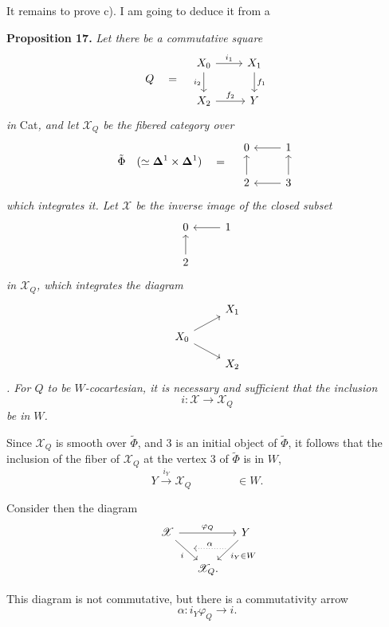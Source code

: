 \documentclass[11pt]{article}
\newcommand{\printedpage}[1]{\marginpar{\footnotesize p.~#1}}
\newcommand{\msp}[1]{\marginpar{\footnotesize [#1]}}
\newcommand{\cX}{\mathscr{X}}
\begin{document}
\printedpage{150}

It remains to prove c). I am going to deduce it from a

\textbf{Proposition 17.} \textit{Let there be a commutative square}
\[
Q \quad = \quad
\begin{tikzcd}[ampersand replacement=\&]
X_0 \arrow[r, "i_1"] \arrow[d, "i_2"'] \& X_1 \arrow[d, "f_1"] \\
X_2 \arrow[r, "f_2"] \& Y
\end{tikzcd}
\]
\textit{in} Cat\textit{, and let $\cX_Q$ be the fibered category over}
\[
\tilde{\Phi} \quad (\simeq \mathbf{\Delta}^1 \times \mathbf{\Delta}^1) \quad = \quad
\begin{tikzcd}[ampersand replacement=\&]
0 \& 1 \arrow[l] \\
2 \arrow[u] \& 3 \arrow[l] \arrow[u]
\end{tikzcd}
\]
\textit{which integrates it. Let $\cX$ be the inverse image of the closed subset}
\[
\begin{tikzcd}[ampersand replacement=\&]
0 \& 1 \arrow[l] \\
2 \arrow[u] \&
\end{tikzcd}
\]
\msp{page 235}
\textit{in $\cX_Q$, which integrates the diagram}
\[
\begin{tikzcd}[ampersand replacement=\&, row sep=small]
 \& X_1 \\
X_0 \arrow[ru] \arrow[rd] \& \\
 \& X_2
\end{tikzcd}
\]
\textit{. For $Q$ to be $W$-cocartesian, it is necessary and sufficient that the inclusion}
\[
i : \cX \longrightarrow \cX_Q
\]
\textit{be in $W$.}

Since $\cX_Q$ is smooth over $\tilde{\Phi}$, and 3 is an initial object of $\tilde{\Phi}$, it follows that the inclusion of the fiber of $\cX_Q$ at the vertex 3 of $\tilde{\Phi}$ is in $W$,
\[
Y \xrightarrow{i_Y} \cX_Q \qquad\qquad \in W.
\]

Consider then the diagram
\[
\begin{tikzcd}[ampersand replacement=\&, column sep=small]
\cX \arrow[rr, "\varphi_Q"] \arrow[rd, "i"', ""{name=direct,pos=.55,above right}] \& \& Y \arrow[ld, "i_Y\in W", ""{name=via,pos=.30,below left}] \\
 \& \cX_Q. \& \arrow[from=via,to=direct,dotted,shorten <=1pt,shorten >=1pt,"\alpha"']
\end{tikzcd}
\]

\printedpage{151}

This diagram is not commutative, but there is a commutativity arrow
\[
\alpha : i_Y\varphi_Q \longrightarrow i.
\]
\end{document}
